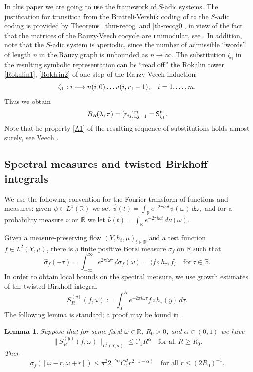 \documentclass[10pt]{amsart}
\def\mto{\mathchoice{\longmapsto}{\mapsto}{\mapsto}{\mapsto}}
\newcommand{\sep}{:}
\theoremstyle{plain}
\newtheorem{lemma}[theorem]{Lemma}
\theoremstyle{definition}
\let\lam\lambda
\let\om\omega
\let\sig\sigma
\newcommand{\R}{\mathbb{R}}
\newcommand\Sf{{\sf S}}
\newcommand\be{\begin{equation}}
\newcommand\ee{\end{equation}}
\begin{document}
In this paper we are going to use the framework of $S$-adic systems. The justification for transition from the Bratteli-Vershik coding of \cite{Buf-umn} to the $S$-adic coding is provided by Theorems~\ref{thm-recog} and \ref{th-recog0}, in view of the fact that the matrices of the Rauzy-Veech cocycle are unimodular, see \cite{veech,veechamj}. In addition, note that the $S$-adic system is aperiodic, since the number of admissible ``words'' of length $n$ in the Rauzy graph is unbounded as $n\to \infty$.
The substitution $\zeta_1$ in the resulting symbolic representation can be ``read off'' the Rokhlin tower \eqref{Rokhlin1}, \eqref{Rokhlin2} of one step of the Rauzy-Veech induction:
\be \label{induc}
\zeta_1\sep i \mto n(i,0)\ldots n(i, r_1-1),\quad i=1,\ldots,m.
\ee
Thus we obtain
\[
B_R(\lam,\pi) = { [r_{ij}]_{i,j=1}^m} = \Sf_{\zeta_1}^t.\]
Note that he property \eqref{A1} of the resulting sequence of substitutions
holds almost surely, see Veech \cite{veech}.


\subsection{Spectral measures and twisted Birkhoff integrals} \label{sec-twist}
We use the following convention for the Fourier transform of functions and measures: given $\psi\in L^1(\R)$ we set
$
\widehat{\psi}(t) = \int_\R e^{-2\pi i \om t} \psi(\om)\,d\om,
$
and for a probability measure $\nu$ on $\R$ we let
$
\widehat{\nu}(t) = \int_\R e^{-2\pi i \om t}\,d\nu(\om).
$

Given a measure-preserving flow
$(Y, h_t,\mu)_{t\in \R}$ and a test function $f\in L^2(Y,\mu)$,
there is a finite positive Borel measure $\sig_f$ on $\R$ such that
\[
\widehat{\sig}_f(-\tau)=\int_{-\infty}^\infty e^{2 \pi i\om \tau}\,d\sig_f(\om) = \langle f\circ h_\tau, f\rangle\quad \text{for}\ \tau\in \R.
\]
In order to obtain local bounds on the spectral measure, we use growth estimates of the twisted Birkhoff integral
\be \label{twist1}
S_R^{(y)}(f,\om) := \int_0^R e^{-2\pi i \om \tau} f\circ h_\tau(y)\,d\tau.
\ee
The following lemma is standard; a proof may be found in \cite[Lem.\,4.3]{BuSol2}.

\begin{lemma} \label{lem-varr} Suppose that for some fixed $\om \in \R$, $R_0>0$, and $\alpha \in (0,1)$ we have
\be \label{L2est}
\bigl\|S_R^{(y)}(f,\om)\bigr\|_{L^2(Y,\mu)}\le C_1R^\alpha\quad \text{for all }R\ge R_0.
\ee
Then
\be \label{locest}
\sig_f([\om-r,\om+r]) \le \pi^2 2^{-2\alpha} C_1^2 r^{2(1-\alpha)}\quad \text{for all }r \le (2R_0)^{-1}.
\ee
\end{lemma}
\end{document}
